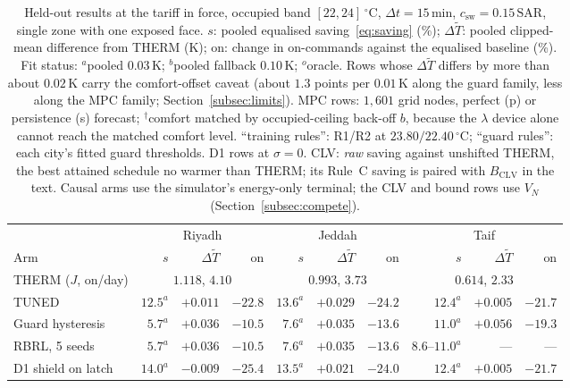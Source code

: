 \documentclass[3p,twocolumn,number]{elsarticle}
\newcommand{\csw}{c_{\mathrm{sw}}}
\newcommand{\SAR}{\text{SAR}}
\begin{document}
\begin{table}[t]
\centering
\caption{Held-out results at the tariff in force, occupied band
$[22,24]\,^\circ$C, $\Delta t=15\,$min, $\csw=0.15\,\SAR$, single zone with
one exposed face. $s$: pooled equalised saving~\eqref{eq:saving} (\%);
$\Delta\tilde T$: pooled clipped-mean difference from THERM (K); on: change
in on-commands against the equalised baseline (\%). Fit status:
$^{a}$pooled $0.03\,$K; $^{b}$pooled fallback $0.10\,$K; $^{o}$oracle. Rows
whose $\Delta\tilde T$ differs by more than about $0.02\,$K carry the
comfort-offset caveat (about $1.3$ points per $0.01\,$K along the guard
family, less along the MPC family; Section~\ref{subsec:limits}). MPC rows: $1{,}601$ grid nodes, perfect (p) or
persistence (s) forecast; $^{\dagger}$comfort matched by occupied-ceiling
back-off $b$, because the $\lambda$ device alone cannot reach the matched
comfort level. ``training rules'': R1/R2 at $23.80/22.40\,^\circ$C; ``guard
rules'': each city's fitted guard thresholds. D1 rows at $\sigma=0$. CLV:
\emph{raw} saving against unshifted THERM, the best attained schedule no
warmer than THERM; its Rule~C saving is paired with $B_{\mathrm{CLV}}$ in the
text. Causal arms use the simulator's energy-only terminal; the CLV and bound
rows use $V_N$ (Section~\ref{subsec:compete}).}
\label{tab:main}
\setlength{\tabcolsep}{1.5pt}
\footnotesize
\begin{tabular*}{\textwidth}{@{\extracolsep{\fill}}lrrrrrrrrr@{}}
\toprule
 & \multicolumn{3}{c}{Riyadh} & \multicolumn{3}{c}{Jeddah} & \multicolumn{3}{c}{Taif} \\
\cmidrule(lr){2-4}\cmidrule(lr){5-7}\cmidrule(lr){8-10}
Arm & $s$ & $\Delta\tilde T$ & on & $s$ & $\Delta\tilde T$ & on & $s$ & $\Delta\tilde T$ & on \\
\midrule
THERM ($J$, on/day) & \multicolumn{3}{c}{$1.118$, $4.10$} & \multicolumn{3}{c}{$0.993$, $3.73$} & \multicolumn{3}{c}{$0.614$, $2.33$} \\
TUNED & $12.5^{a}$ & $+0.011$ & $-22.8$ & $13.6^{a}$ & $+0.029$ & $-24.2$ & $12.4^{a}$ & $+0.005$ & $-21.7$ \\
Guard hysteresis & $5.7^{a}$ & $+0.036$ & $-10.5$ & $7.6^{a}$ & $+0.035$ & $-13.6$ & $11.0^{a}$ & $+0.056$ & $-19.3$ \\
RBRL, 5 seeds & $5.7^{a}$ & $+0.036$ & $-10.5$ & $7.6^{a}$ & $+0.035$ & $-13.6$ & $8.6$--$11.0^{a}$ & --- & --- \\
D1 shield on latch & $14.0^{a}$ & $-0.009$ & $-25.4$ & $13.5^{a}$ & $+0.021$ & $-24.0$ & $12.4^{a}$ & $+0.005$ & $-21.7$ \\

\end{tabular*}
\end{table}
\end{document}
